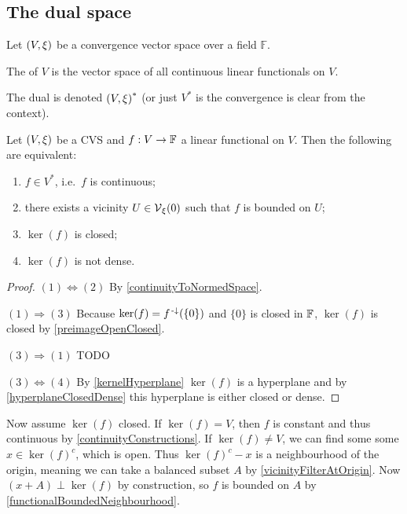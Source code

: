 \subsection{The dual space}
\begin{definition}
Let $\left( V,\xi \right)$ be a convergence vector space over a field $\mathbb{F}$.

The  of $V$ is the vector space of all continuous linear functionals on $V$.

The dual is denoted $\left( V,\xi \right)^{*}$ (or just $V^*$ is the convergence is clear from the context).
\end{definition}

\begin{proposition} \label{continuityLinearFunctionals}
Let $\left( V, \xi \right)$ be a CVS and $f:V\to \mathbb{F}$ a linear functional on $V$. Then the following are equivalent:
\begin{enumerate}
\item $f\in V^{*}$, i.e.\ $f$ is continuous;
\item there exists a vicinity $U\in \operatorname{\mathcal{V}}_\xi(0)$ such that $f$ is bounded on $U$;
\item $\ker(f)$ is closed;
\item $\ker(f)$ is not dense.
\end{enumerate}
\end{proposition}
\begin{proof}
$(1) \Leftrightarrow (2)$ By \ref{continuityToNormedSpace}.

$(1) \Rightarrow (3)$ Because $\ker(f) = f^{{\text{\hspace{0.15em}-}\downarrow}}(\{0\})$ and $\{0\}$ is closed in $\mathbb{F}$, $\ker(f)$ is closed by \ref{preimageOpenClosed}.

$(3) \Rightarrow (1)$ TODO

$(3) \Leftrightarrow (4)$ By \ref{kernelHyperplane} $\ker(f)$ is a hyperplane and by \ref{hyperplaneClosedDense} this hyperplane is either closed or dense.
\end{proof}

Now assume $\ker(f)$ closed. If $\ker(f) = V$, then $f$ is constant and thus continuous by \ref{continuityConstructions}. If $\ker(f) \neq V$, we can find some some $x\in \ker(f)^c$, which is open. Thus $\ker(f)^c - x$ is a neighbourhood of the origin, meaning we can take a balanced subset $A$ by \ref{vicinityFilterAtOrigin}. Now $(x+A)\perp \ker(f)$ by construction, so $f$ is bounded on $A$ by \ref{functionalBoundedNeighbourhood}.


